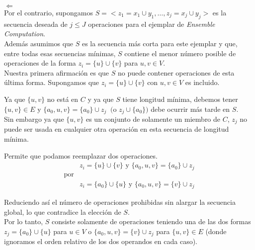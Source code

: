 \documentclass{beamer}
\begin{document}

\begin{frame}
    \underline{$\Leftarrow$} \\
    Por el contrario, supongamos $S = <z_1 = x_1 \cup y_1, \dots, z_j = x_j \cup y_j>$ es la secuencia deseada de $j \leq J$ operaciones para el ejemplar de \textit{Ensemble Computation}. \\ 
    
    Además asumimos que $S$ es la secuencia más corta para este ejemplar y que, entre todas esas secuencias mínimas, $S$ contiene el menor número posible de operaciones de la forma $z_i = \{u\} \cup \{v\}$ para $u, v \in V$. \\
    
    Nuestra primera afirmación es que $S$ no puede contener operaciones de esta última forma. Supongamos que $z_i =  \{u\} \cup \{v\}$ con $u, v \in V$ es incluido.     
\end{frame}


\begin{frame}
     Ya que $\{u, v\}$ no está en $C$ y ya que $S$ tiene longitud mínima, debemos tener  $\{u, v\} \in E$ y $\{a_0, u, v\} = \{a_0\} \cup z_j\ \text{ (o }z_j \cup \{a_0\})$ debe ocurrir más tarde en $S$. \\
     
     Sin embargo ya que $\{u, v\}$ es un conjunto de solamente un miembro de $C$, $z_j$ no puede ser usada en cualquier otra operación en esta secuencia de longitud mínima.
\end{frame}


\begin{frame}
     Permite que podamos reemplazar dos operaciones. \\
     \begin{align*}
         & z_i = \{u\} \cup \{v\}\text{ y }\{a_0, u, v\} = \{a_0\} \cup z_j \\
         \text{por} \\
         & z_i = \{a_0\} \cup \{u\}\text{ y }\{a_0, u, v\} = \{v\} \cup z_j
     \end{align*}
     
    Reduciendo así el número de operaciones prohibidas sin alargar la secuencia global, lo que contradice la elección de $S$. \\
    
    Por lo tanto, $S$ consiste solamente de operaciones teniendo una de las dos formas $z_j =  \{a_0\} \cup \{u\}$ para $u \in V$ o  $\{a_0, u, v\} = \{v\} \cup z_j$ para $\{u, v\} \in E$ (donde ignoramos el orden relativo de los dos operandos en cada caso).
\end{frame}
\end{document}
